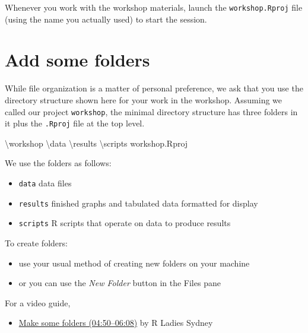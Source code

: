 \documentclass[
]{book}
\newenvironment{Shaded}{\begin{snugshade}}{\end{snugshade}}
\newcommand{\NormalTok}[1]{#1}
\providecommand{\tightlist}{%
  \setlength{\itemsep}{0pt}\setlength{\parskip}{0pt}}
\begin{document}
Whenever you work with the workshop materials, launch the \texttt{workshop.Rproj} file (using the name you actually used) to start the session.

\hypertarget{add-some-folders}{%
\section{Add some folders}\label{add-some-folders}}

While file organization is a matter of personal preference, we ask that you use the directory structure shown here for your work in the workshop. Assuming we called our project \texttt{workshop}, the minimal directory structure has three folders in it plus the \texttt{.Rproj} file at the top level.

\begin{Shaded}
\begin{Highlighting}[]
\NormalTok{\textbackslash{}workshop}
\NormalTok{    \textbackslash{}data}
\NormalTok{    \textbackslash{}results}
\NormalTok{    \textbackslash{}scripts}
\NormalTok{    workshop.Rproj}
\end{Highlighting}
\end{Shaded}

We use the folders as follows:

\begin{itemize}
\tightlist
\item
  \texttt{data} data files
\item
  \texttt{results} finished graphs and tabulated data formatted for display\\
\item
  \texttt{scripts} R scripts that operate on data to produce results
\end{itemize}

To create folders:

\begin{itemize}
\tightlist
\item
  use your usual method of creating new folders on your machine
\item
  or you can use the \emph{New Folder} button in the Files pane
\end{itemize}

For a video guide,

\begin{itemize}
\tightlist
\item
  \href{https://www.youtube.com/embed/kfcX5DEMAp4?start=290\&end=368}{Make some folders (04:50--06:08)} by R Ladies Sydney \citep{RLadiesSydney:2018:Lesson1}
\end{itemize}
\end{document}
